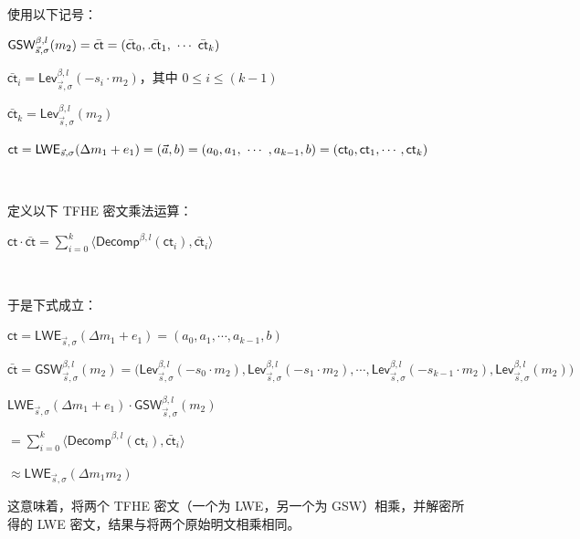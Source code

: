 $ $

\noindent 使用以下记号：

$\textsf{GSW}_{\vec{s}, \sigma}^{\beta, l}(m_2) = {\bar{\textsf{ct}}} = (\bar{\textsf{ct}}_0,. \bar{\textsf{ct}}_1, \text{ } \text{$\cdots$} \text{ } \bar{\textsf{ct}}_k)$ 

$\bar{\textsf{ct}}_i = \textsf{Lev}_{\vec{s}, \sigma}^{\beta, l}(-s_i \cdot m_2)$，其中 $0 \leq i \leq (k-1)$

$\bar{\textsf{ct}}_k = \textsf{Lev}_{\vec{s}, \sigma}^{\beta, l}(m_2)$

$\textsf{ct} = \textsf{LWE}_{\vec{s}, \sigma}(\Delta m_1 + e_1) = (\vec{a}, b) = (a_0, a_1, \text{ } \text{$\cdots$} \text{ }, a_{k-1}, b) = (\textsf{ct}_0, \textsf{ct}_1, \cdots, \textsf{ct}_k)$

$ $

\noindent 定义以下 TFHE 密文乘法运算：

$\textsf{ct} \cdot {\bar{\textsf{ct}}} = \sum\limits_{i=0}^{k}\langle \textsf{Decomp}^{\beta, l}(\textsf{ct}_i), \bar{\textsf{ct}}_i \rangle$

$ $

\noindent 于是下式成立：

\begin{tcolorbox}[title={\textbf{\tboxlabel{\ref*{subsec:tfhe-mult-cipher}} TFHE 密文与密文乘法}}]
$\textsf{ct} = \textsf{LWE}_{\vec{s}, \sigma}(\Delta m_1 + e_1) = (a_0, a_1, \cdots, a_{k-1}, b)$

$\bar{\textsf{ct}} = \textsf{GSW}_{\vec{s}, \sigma}^{\beta, l}(m_2) = \bm( \textsf{Lev}_{\vec{s}, \sigma}^{\beta, l}(-s_0\cdot m_2), \textsf{Lev}_{\vec{s}, \sigma}^{\beta, l}(-s_1\cdot m_2), \cdots, \textsf{Lev}_{\vec{s}, \sigma}^{\beta, l}(-s_{k-1}\cdot m_2), \textsf{Lev}_{\vec{s}, \sigma}^{\beta, l}(m_2)  \bm)$

$\textsf{LWE}_{\vec{s}, \sigma}(\Delta m_1 + e_1) \cdot \textsf{GSW}_{\vec{s}, \sigma}^{\beta, l}(m_2) $

$= \sum\limits_{i=0}^{k}\langle \textsf{Decomp}^{\beta, l}(\textsf{ct}_i), \bar{\textsf{ct}}_i \rangle $

$\approx \textsf{LWE}_{\vec{s}, \sigma}(\Delta m_1 m_2)$
\end{tcolorbox}

这意味着，将两个 TFHE 密文（一个为 LWE，另一个为 GSW）相乘，并解密所得的 LWE 密文，结果与将两个原始明文相乘相同。


